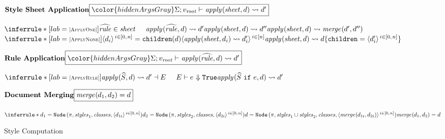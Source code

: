 \documentclass[acmsmall, screen]{acmart}
\newcommand{\set}[1]{\{#1\}}
\newcommand{\varExp}{e}
\newcommand{\varGuardedRule}{\mathit{rule}}
\newcommand{\varPathSelector}{S}
\newcommand{\varStyleSheet}
{\mathit{sheet}}
\newcommand{\varAttrs}{\mathit{styles}}
\newcommand{\varClasses}{\mathit{classes}}
\newcommand{\varTypeContext}{\Sigma} \newcommand{\varVar}{x}
\newcommand{\varDoc}{d}
\newcommand{\varVal}{v}
\newcommand{\varEnv}{E}
\newcommand{\varPath}{\pi}
\newcommand{\varInternalRule}{\widehat{\varGuardedRule}}
\newcommand{\varPathRule}{\widehat{\varPathSelector}}
\newcommand{\smallSep}
  {\hspace{0.02in}}
\newcommand{\sepPremise}{\hspace{0.20in}}
\newcommand{\hsepRule}{\hspace{0.20in}}
\newcommand{\vsepRuleHeight}{0.12in}
\newcommand{\vsepRule}{\vspace{\vsepRuleHeight}}
\newcommand{\dataApp}[2]{#1\smallSep#2}
\newcommand{\valTrue}{\texttt{True}}
\newcommand{\valRoot}{\varVal_{\mathit{root}}}
\newcommand{\node}[4]
{\dataApp{\texttt{Node}}{(#1, #3, #2, #4)}}
\newcommand{\childrenOf}[1]{\dataApp{\texttt{children}}\!(#1)}
\newcommand{\copyUpdate}[3]
  {#1 \set{#2 = #3}}
\newcommand{\rangeN}[3]
{\langle#3\rangle\smallSep^{#1 \in [#2]}}
\newcommand{\rangeZeroN}[3]
{\langle#3\rangle\smallSep^{#1 \in [0,\hspace{0.01in}#2]}}
\newcommand{\mergeTwo}[3]{\ensuremath{\mathit{merge}_{#1}(\hspace{-0.005in}#2,#3)}}
\newcommand{\applyTwo}[3]{\ensuremath{\mathit{apply}_{#1}(\hspace{-0.005in}#2,#3)}}
\newcommand{\mergeDocs}[2]
{\mergeTwo{}{#1}{#2}}
\newcommand{\guardedRule}[2]{#1\ \texttt{if}\ #2}
\newcommand{\JudgementBox}[1]{{
\fbox{\ensuremath{#1}}
}}
\newcommand{\relDescription}[1]{\ensuremath{\textrm{\textbf{#1}}}}
\newcommand{\judgementHead}[2]
  {\ensuremath{\relDescription{#1}\hfill\JudgementBox{#2}}}
\newcommand{\ruleNameFig}[1]{\textsc{\begin{scriptsize}[#1]\end{scriptsize}}}
\newcommand{\applyStyleSheetEquals}[3]{\applyTwo{}{#1}{#2}\rightsquigarrow{#3}}
\newcommand{\applyPathRuleEquals}[4]{\applyTwo{}{#1}{#2}\rightsquigarrow\outputPair{#3}{#4}}
\newcommand{\applyGuardedRuleEquals}[3]{\applyTwo{}{#1}{#2}\rightsquigarrow{#3}}
\newcommand{\evalsTo}[3]
  {\ensuremath{{#1}\vdash{#2}\hspace{0.01in}\Downarrow{#3}}}
\newcommand{\hiddenArgsTwo}[2]{\ensuremath{{\color{hiddenArgsGray}#1;#2\vdash\ }}}
\begin{document}
\begin{figure}[t]





\judgementHead
  {Style Sheet Application}
  {\hiddenArgsTwo{\varTypeContext}{\valRoot}
   \applyStyleSheetEquals{\varStyleSheet}{\varDoc}{\varDoc'}}

\vsepRule 

$
\inferrule*[lab=\ruleNameFig{ApplyOne}]
  {\varInternalRule \in \varStyleSheet \sepPremise
   \applyGuardedRuleEquals{\varInternalRule}{\varDoc}{\varDoc'} \\\\
   \applyStyleSheetEquals{\varStyleSheet}{\varDoc}{\varDoc''}
  }
  {\applyStyleSheetEquals
    {\varStyleSheet}{\varDoc}
    {\mergeDocs{\varDoc'}{\varDoc''}}}
$
\hsepRule
$
\inferrule*[lab=\ruleNameFig{ApplyNone}]
{\rangeZeroN{i}{n}{\varDoc_i} = \childrenOf{\varDoc} \\\\
   \rangeN{i}{n}{\applyStyleSheetEquals{\varStyleSheet}{\varDoc_i}{\varDoc_i'}}
  }
  {\applyStyleSheetEquals
    {\varStyleSheet}{\varDoc}
    {\copyUpdate{\varDoc}{\texttt{children}}{\rangeZeroN{i}{n}{\varDoc_i'}}}}
$

\vsepRule

\judgementHead
  {Rule Application}
  {\hiddenArgsTwo{\varTypeContext}{\valRoot}
   \applyGuardedRuleEquals{\varInternalRule}{\varDoc}{\varDoc'}}

\vsepRule

$
\inferrule*[lab=\ruleNameFig{ApplyRule}]
  {\applyPathRuleEquals
    {\varPathRule}{\varDoc}
    {\varDoc'}{\varEnv} \sepPremise
   \evalsTo{\varEnv}{\varExp}{\valTrue}
  }
  {\applyGuardedRuleEquals
    {\guardedRule{\varPathRule}{\varExp}}{\varDoc}
    {\varDoc'}}
$

\vsepRule

\judgementHead
  {Document Merging}
  {\mergeDocs{\varDoc_1}{\varDoc_2}=\varDoc}

\vsepRule

$
\inferrule* {\varDoc_1 =
     \node{\varPath}{\varClasses}{\varAttrs_1}
       {\rangeZeroN{i}{n}{\varDoc_{1i}}}
   \\\\
   \varDoc_2 =
     \node{\varPath}{\varClasses}{\varAttrs_2}
       {\rangeZeroN{i}{n}{\varDoc_{2i}}}
   \\\\
   \varDoc =
     \node{\varPath}{\varClasses}{\varAttrs_1 \cup \varAttrs_2}
       {\rangeZeroN{i}{n}{\mergeDocs{\varDoc_{1i}}{\varDoc_{2i}}}}
  }
  {\mergeDocs{\varDoc_1}{\varDoc_2}={\varDoc}}
$

\vsepRule

\caption{Style Computation}
\label{fig:style-computation}
\end{figure}
\end{document}

